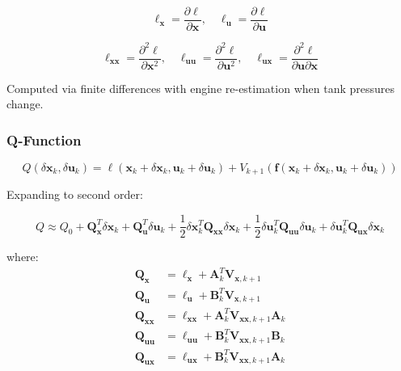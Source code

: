 \documentclass[11pt,a4paper]{article}
\begin{document}
\begin{equation}
\ell_{\mathbf{x}} = \frac{\partial \ell}{\partial \mathbf{x}}, \quad \ell_{\mathbf{u}} = \frac{\partial \ell}{\partial \mathbf{u}}
\end{equation}

\begin{equation}
\ell_{\mathbf{xx}} = \frac{\partial^2 \ell}{\partial \mathbf{x}^2}, \quad \ell_{\mathbf{uu}} = \frac{\partial^2 \ell}{\partial \mathbf{u}^2}, \quad \ell_{\mathbf{ux}} = \frac{\partial^2 \ell}{\partial \mathbf{u} \partial \mathbf{x}}
\end{equation}

Computed via finite differences with engine re-estimation when tank pressures change.

\subsubsection{Q-Function}

\begin{equation}
Q(\delta \mathbf{x}_k, \delta \mathbf{u}_k) = \ell(\mathbf{x}_k + \delta \mathbf{x}_k, \mathbf{u}_k + \delta \mathbf{u}_k) + V_{k+1}(\mathbf{f}(\mathbf{x}_k + \delta \mathbf{x}_k, \mathbf{u}_k + \delta \mathbf{u}_k))
\end{equation}

Expanding to second order:

\begin{equation}
Q \approx Q_0 + \mathbf{Q}_{\mathbf{x}}^T \delta \mathbf{x}_k + \mathbf{Q}_{\mathbf{u}}^T \delta \mathbf{u}_k + \frac{1}{2} \delta \mathbf{x}_k^T \mathbf{Q}_{\mathbf{xx}} \delta \mathbf{x}_k + \frac{1}{2} \delta \mathbf{u}_k^T \mathbf{Q}_{\mathbf{uu}} \delta \mathbf{u}_k + \delta \mathbf{u}_k^T \mathbf{Q}_{\mathbf{ux}} \delta \mathbf{x}_k
\end{equation}

where:
\begin{align}
\mathbf{Q}_{\mathbf{x}} &= \ell_{\mathbf{x}} + \mathbf{A}_k^T \mathbf{V}_{\mathbf{x},k+1} \\
\mathbf{Q}_{\mathbf{u}} &= \ell_{\mathbf{u}} + \mathbf{B}_k^T \mathbf{V}_{\mathbf{x},k+1} \\
\mathbf{Q}_{\mathbf{xx}} &= \ell_{\mathbf{xx}} + \mathbf{A}_k^T \mathbf{V}_{\mathbf{xx},k+1} \mathbf{A}_k \\
\mathbf{Q}_{\mathbf{uu}} &= \ell_{\mathbf{uu}} + \mathbf{B}_k^T \mathbf{V}_{\mathbf{xx},k+1} \mathbf{B}_k \\
\mathbf{Q}_{\mathbf{ux}} &= \ell_{\mathbf{ux}} + \mathbf{B}_k^T \mathbf{V}_{\mathbf{xx},k+1} \mathbf{A}_k
\end{align}
\end{document}
